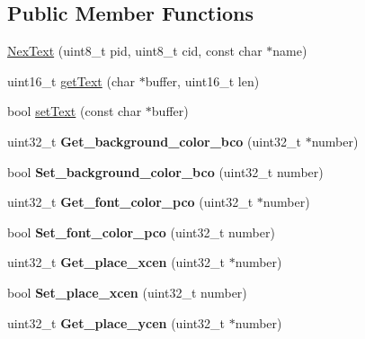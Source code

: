 \subsection*{Public Member Functions}
\begin{DoxyCompactItemize}
\item 
\hyperlink{class_nex_text_a38b4dd752d39bfda4ef7642b43ded91a}{Nex\+Text} (uint8\+\_\+t pid, uint8\+\_\+t cid, const char $\ast$name)
\item 
uint16\+\_\+t \hyperlink{class_nex_text_a9cf417b2f25df2872492c55bdc9f5b30}{get\+Text} (char $\ast$buffer, uint16\+\_\+t len)
\item 
bool \hyperlink{class_nex_text_a19589b32c981436a1bbcfe407bc766e3}{set\+Text} (const char $\ast$buffer)
\item 
\hypertarget{class_nex_text_aec8d21665688ba80f3136a1f5e23fef5}{uint32\+\_\+t {\bfseries Get\+\_\+background\+\_\+color\+\_\+bco} (uint32\+\_\+t $\ast$number)}\label{class_nex_text_aec8d21665688ba80f3136a1f5e23fef5}

\item 
\hypertarget{class_nex_text_a1b1586e5e66d76a4f8f5c40b0986f471}{bool {\bfseries Set\+\_\+background\+\_\+color\+\_\+bco} (uint32\+\_\+t number)}\label{class_nex_text_a1b1586e5e66d76a4f8f5c40b0986f471}

\item 
\hypertarget{class_nex_text_a860af363c6de6180ef356cad31936185}{uint32\+\_\+t {\bfseries Get\+\_\+font\+\_\+color\+\_\+pco} (uint32\+\_\+t $\ast$number)}\label{class_nex_text_a860af363c6de6180ef356cad31936185}

\item 
\hypertarget{class_nex_text_ab59df7e777198eefb422ba2081d0cfce}{bool {\bfseries Set\+\_\+font\+\_\+color\+\_\+pco} (uint32\+\_\+t number)}\label{class_nex_text_ab59df7e777198eefb422ba2081d0cfce}

\item 
\hypertarget{class_nex_text_a510a937a104b41859badc220a8ba39fb}{uint32\+\_\+t {\bfseries Get\+\_\+place\+\_\+xcen} (uint32\+\_\+t $\ast$number)}\label{class_nex_text_a510a937a104b41859badc220a8ba39fb}

\item 
\hypertarget{class_nex_text_ab94a4b8505a9bfdf8fb4cb8cb32a1763}{bool {\bfseries Set\+\_\+place\+\_\+xcen} (uint32\+\_\+t number)}\label{class_nex_text_ab94a4b8505a9bfdf8fb4cb8cb32a1763}

\item 
\hypertarget{class_nex_text_a9bd42732e37497a8fb44ece94b39285c}{uint32\+\_\+t {\bfseries Get\+\_\+place\+\_\+ycen} (uint32\+\_\+t $\ast$number)}\label{class_nex_text_a9bd42732e37497a8fb44ece94b39285c}


\end{DoxyCompactItemize}
